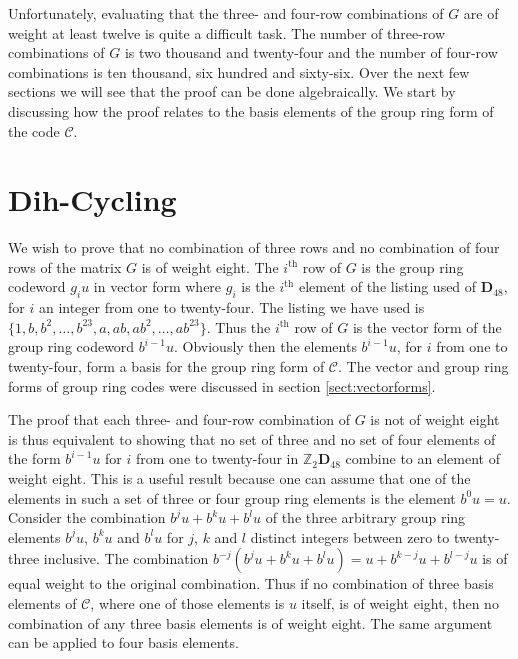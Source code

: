 Unfortunately, evaluating that the three- and four-row combinations of $G$ are of weight at least twelve is quite a difficult task.
The number of three-row combinations of $G$ is two thousand and twenty-four and the number of four-row combinations is ten thousand, six hundred and sixty-six.
Over the next few sections we will see that the proof can be done algebraically.
We start by discussing how the proof relates to the basis elements of the group ring form of the code $\mathcal{C}$.

\section{Dih-Cycling}
\label{sect:dihcycling}
We wish to prove that no combination of three rows and no combination of four rows of the matrix $G$ is of weight eight.
The $i^\textrm{th}$ row of $G$ is the group ring codeword $g_i u$ in vector form where $g_i$ is the $i^{\textrm{th}}$ element of the listing used of $\mathbf{D}_{48}$, for $i$ an integer from one to twenty-four.
The listing we have used is $\{ 1 , b , b^2 , \ldots , b^{23}, a , ab , ab^2 , \ldots , ab^{23} \}$.
Thus the $i^{\textrm{th}}$ row of $G$ is the vector form of the group ring codeword $b^{i-1} u$.
Obviously then the elements $b^{i-1} u$, for $i$ from one to twenty-four, form a basis for the group ring form of $\mathcal{C}$.
The vector and group ring forms of group ring codes were discussed in section \ref{sect:vectorforms}.

The proof that each three- and four-row combination of $G$ is not of weight eight is thus equivalent to showing that no set of three and no set of four elements of the form $b^{i-1} u$ for $i$ from one to twenty-four in $\mathbb{Z}_2 \mathbf{D}_{48}$ combine to an element of weight eight.
This is a useful result because one can assume that one of the elements in such a set of three or four group ring elements is the element $b^0 u = u$.
Consider the combination $b^j u + b^k u + b^l u $ of the three arbitrary group ring elements $b^j u$, $b^k u$ and $b^l u$ for $j$, $k$ and $l$ distinct integers between zero to twenty-three inclusive.
The combination $b^{-j}(b^j u + b^k u + b^l u ) = u + b^{k-j} u + b^{l-j} u $ is of equal weight to the original combination.
Thus if no combination of three basis elements of $\mathcal{C}$, where one of those elements is $u$ itself, is of weight eight, then no combination of any three basis elements is of weight eight.
The same argument can be applied to four basis elements.

